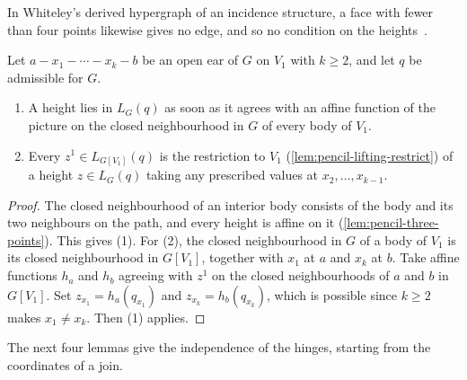 In Whiteley's derived hypergraph of an incidence structure, a face with
fewer than four points likewise gives no edge, and so no condition on the
heights~\cite[Definition~3.2]{whiteley1989}.

\begin{lemma}
  \label{lem:pencil-ear-fibre}
  \leanok
  Let $a - x_1 - \cdots - x_k - b$ be an open ear of $G$ on $V_1$ with
  $k \ge 2$, and let $q$ be admissible for $G$.
  \begin{enumerate}
    \item A height lies in $L_G(q)$ as soon as it agrees with an affine
      function of the picture on the closed neighbourhood in $G$ of
      every body of $V_1$.
    \item Every $z^1 \in L_{G[V_1]}(q)$ is the restriction to $V_1$
      (\cref{lem:pencil-lifting-restrict}) of a height $z \in L_G(q)$
      taking any prescribed values at $x_2, \dots, x_{k-1}$.
  \end{enumerate}
\end{lemma}
\begin{proof}
  \leanok
  The closed neighbourhood of an interior body consists of the body and
  its two neighbours on the path, and every height is affine on it
  (\cref{lem:pencil-three-points}). This gives (1). For (2), the closed
  neighbourhood in $G$ of a body of $V_1$ is its closed neighbourhood in
  $G[V_1]$, together with $x_1$ at $a$ and $x_k$ at $b$. Take affine
  functions $h_a$ and $h_b$ agreeing with $z^1$ on the closed
  neighbourhoods of $a$ and $b$ in $G[V_1]$. Set
  $z_{x_1} = h_a(q_{x_1})$ and $z_{x_k} = h_b(q_{x_k})$, which is
  possible since $k \ge 2$ makes $x_1 \neq x_k$. Then (1) applies.
\end{proof}

The next four lemmas give the independence of the hinges, starting from
the coordinates of a join.

